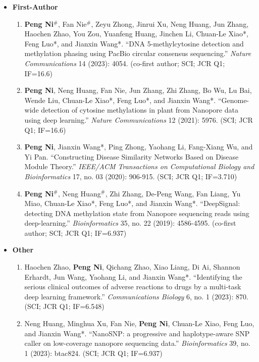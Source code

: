 \documentclass{resume}
\begin{document}
\begin{itemize}
  \item \textbf{First-Author}
  \begin{enumerate}
    \item \textbf{Peng Ni}$^{\#}$, Fan Nie$^{\#}$, Zeyu Zhong, Jinrui Xu, Neng Huang, Jun Zhang, Haochen Zhao, You Zou, Yuanfeng Huang, Jinchen Li, Chuan-Le Xiao*, Feng Luo*, and Jianxin Wang*. \enquote{DNA 5-methylcytosine detection and methylation phasing using PacBio circular consensus sequencing.} {\it Nature Communications} 14 (2023): 4054. (co-first author; SCI; JCR Q1; IF=16.6)
    \item \textbf{Peng Ni}, Neng Huang, Fan Nie, Jun Zhang, Zhi Zhang, Bo Wu, Lu Bai, Wende Liu, Chuan-Le Xiao*, Feng Luo*, and Jianxin Wang*. \enquote{Genome-wide detection of cytosine methylations in plant from Nanopore data using deep learning.} {\it Nature Communications} 12 (2021): 5976. (SCI; JCR Q1; IF=16.6)
    \item \textbf{Peng Ni}, Jianxin Wang*, Ping Zhong, Yaohang Li, Fang-Xiang Wu, and Yi Pan. \enquote{Constructing Disease Similarity Networks Based on Disease Module Theory.} {\it IEEE/ACM Transactions on Computational Biology and Bioinformatics} 17, no. 03 (2020): 906-915. (SCI; JCR Q1; IF=3.710)
    \item \textbf{Peng Ni}$^{\#}$, Neng Huang$^{\#}$, Zhi Zhang, De-Peng Wang, Fan Liang, Yu Miao, Chuan-Le Xiao*, Feng Luo*, and Jianxin Wang*. \enquote{DeepSignal: detecting DNA methylation state from Nanopore sequencing reads using deep-learning.} {\it Bioinformatics} 35, no. 22 (2019): 4586-4595. (co-first author; SCI; JCR Q1; IF=6.937)
  \end{enumerate}
  \item \textbf{Other}
  \begin{enumerate}
    \item Haochen Zhao, \textbf{Peng Ni}, Qichang Zhao, Xiao Liang, Di Ai, Shannon Erhardt, Jun Wang, Yaohang Li, and Jianxin Wang*. \enquote{Identifying the serious clinical outcomes of adverse reactions to drugs by a multi-task deep learning framework.} {\it Communications Biology} 6, no. 1 (2023): 870. (SCI; JCR Q1; IF=6.548)
    \item Neng Huang, Minghua Xu, Fan Nie, \textbf{Peng Ni}, Chuan-Le Xiao, Feng Luo, and Jianxin Wang*. \enquote{NanoSNP: a progressive and haplotype-aware SNP caller on low-coverage nanopore sequencing data.} {\it Bioinformatics} 39, no. 1 (2023): btac824. (SCI; JCR Q1; IF=6.937)

\end{enumerate}
\end{itemize}
\end{document}
